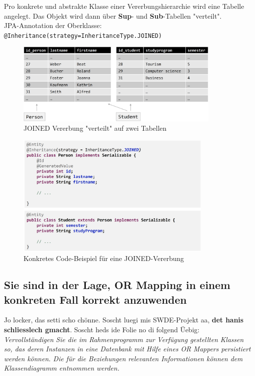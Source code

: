 \documentclass[a4paper]{article}
\begin{document}
			Pro konkrete und abstrakte Klasse einer Vererbungshierarchie wird eine Tabelle angelegt.
			Das Objekt wird dann über \textbf{Sup}- und \textbf{Sub}-Tabellen "verteilt".\\
			JPA-Annotation der Oberklasse: \texttt{@Inheritance(strategy=InheritanceType.JOINED)}
			
			\begin{figure}[!htb]
				\centering
				\includegraphics[keepaspectratio, height=4cm]{img/persistence/joined.png}
				\caption{JOINED Vererbung "verteilt" auf zwei Tabellen}
				\label{fig:joined}
			\end{figure}
		
			\newpage
		
			\begin{figure}[!htb]
				\centering
				\includegraphics[keepaspectratio, height=6cm]{img/persistence/joined_code.png}
				\caption{Konkretes Code-Beispiel für eine JOINED-Vererbung}
				\label{fig:joined_code}
			\end{figure}
		
		
		\subsection{Sie sind in der Lage, OR Mapping in einem konkreten Fall korrekt anzuwenden}
		
		Jo locker, das setti scho chönne.
		Soscht luegi mis SWDE-Projekt aa, \textbf{det hanis schliesslech gmacht}.
		Soscht heds ide Folie no di folgend Üebig:\\
		\textit{Vervollständigen Sie die im Rahmenprogramm zur Verfügung gestellten Klassen so, das deren Instanzen in eine Datenbank mit Hilfe eines OR Mappers persistiert werden können. 
		Die für die Beziehungen relevanten Informationen können dem Klassendiagramm entnommen werden.}
		
\end{document}
